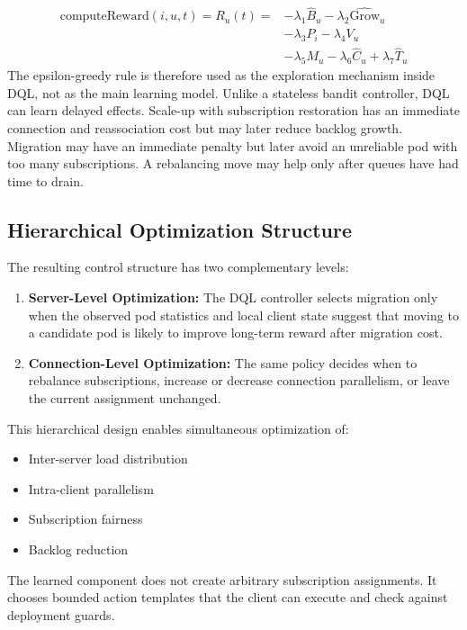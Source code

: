 \begin{align}
	\text{computeReward}(i,u,t)=R_u(t) =
	&-\lambda_1\widehat{B}_u
	-\lambda_2\widehat{\mathrm{Grow}}_u \nonumber\\
	&-\lambda_3 P_i
	-\lambda_4 V_u \nonumber\\
	&-\lambda_5 M_u
	-\lambda_6\widehat{C}_u
	+\lambda_7\widehat{T}_u
	\label{eq:reward_function}
\end{align}
The epsilon-greedy rule is therefore used as the exploration mechanism inside
DQL, not as the main learning model. Unlike a stateless bandit controller, DQL
can learn delayed effects. Scale-up with subscription restoration has an
immediate connection and reassociation cost but may later reduce backlog growth.
Migration may have an immediate penalty but later avoid an unreliable pod with
too many subscriptions. A rebalancing move may help only after queues have had
time to drain.



\subsection{Hierarchical Optimization Structure}

The resulting control structure has two complementary levels:

\begin{enumerate}
	
	\item \textbf{Server-Level Optimization:}
	The DQL controller selects migration only when the observed pod statistics
	and local client state suggest that moving to a candidate pod is likely to
	improve long-term reward after migration cost.
	
	\item \textbf{Connection-Level Optimization:}
	The same policy decides when to rebalance subscriptions, increase or
	decrease connection parallelism, or leave the current assignment unchanged.
	
\end{enumerate}

This hierarchical design enables simultaneous optimization of:

\begin{itemize}
	\item Inter-server load distribution
	\item Intra-client parallelism
	\item Subscription fairness
	\item Backlog reduction
\end{itemize}

The learned component does not create arbitrary subscription assignments.
It chooses bounded action templates that the client can execute and check
against deployment guards.

